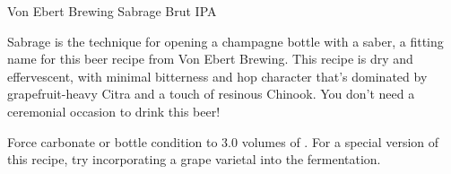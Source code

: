 \begin{recipie}{Von Ebert Brewing Sabrage Brut IPA}

\begin{aboutblock}
Sabrage is the technique for opening a champagne bottle with a saber, a fitting name for
this beer recipe from Von Ebert Brewing. This recipe is dry and effervescent, with minimal
bitterness and hop character that's dominated by grapefruit-heavy Citra and a touch of
resinous Chinook. You don't need a ceremonial occasion to drink this beer!
\end{aboutblock}


\begin{methodandtiming}
 
\begin{mashsteps}
\end{mashsteps}

\begin{fermentationsteps}
\end{fermentationsteps}

\begin{directions}
Force carbonate or bottle condition to 3.0 volumes of . For a special version of
this recipe, try incorporating a grape varietal into the fermentation.
\end{directions}

\end{methodandtiming}

\pagebreak

\begin{ingredientsblock}

\begin{malts}
\end{malts}

\begin{hops}
\end{hops}

\begin{yeasts}
\end{yeasts}

\end{ingredientsblock}

\end{recipie}

